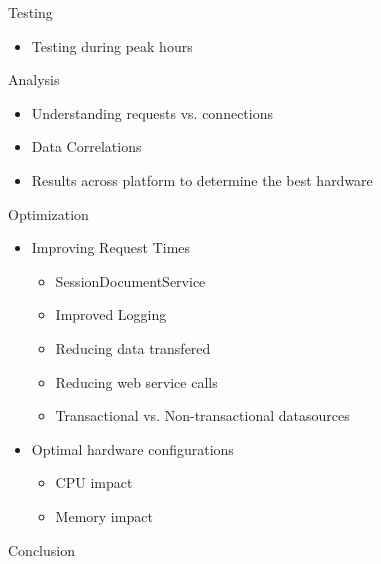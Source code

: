 \documentclass[xcolor=dvipsnames,14pt]{beamer}
\begin{document}
\begin{frame}{Testing}
  \begin{itemize}
    \item Testing during peak hours
  \end{itemize}
\end{frame}

\begin{frame}{Analysis}
  \begin{itemize}
    \item Understanding requests vs. connections
    \item Data Correlations
    \item Results across platform to determine the best hardware
  \end{itemize}
\end{frame}

\begin{frame}{Optimization}
  \begin{itemize}
    \item Improving Request Times
      \begin{itemize}
        \item SessionDocumentService
        \item Improved Logging
        \item Reducing data transfered
        \item Reducing web service calls
        \item Transactional vs. Non-transactional datasources
      \end{itemize}
    \item Optimal hardware configurations
      \begin{itemize}
        \item CPU impact
        \item Memory impact
      \end{itemize}
  \end{itemize}
\end{frame}

\begin{frame}{Conclusion}
\end{frame}
\end{document}
